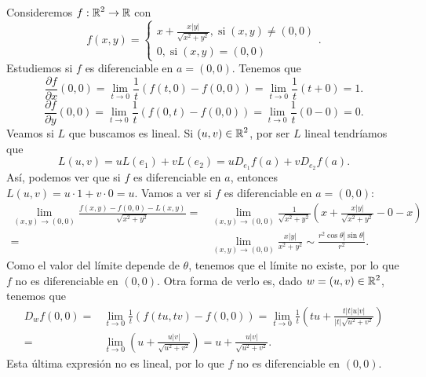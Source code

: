 \begin{eg}
Consideremos $\displaystyle f : \mathbb{R}^{2} \to \mathbb{R} $ con 
\[f\left(x,y\right) = 
\begin{cases}
x + \frac{x \left|y\right|}{\sqrt{x^{2}+y^{2}}}, \; \text{si} \; \left(x,y\right) \neq \left(0,0\right) \\
0, \; \text{si} \; \left(x,y\right) = \left(0,0\right)
\end{cases}
.\]
Estudiemos si $\displaystyle f $ es diferenciable en $\displaystyle a = \left(0,0\right) $. Tenemos que
\[\frac{\partial f}{\partial x}\left(0,0\right) = \lim_{t \to 0}\frac{1}{t}\left(f\left(t,0\right)-f\left(0,0\right)\right) = \lim_{t \to 0}\frac{1}{t}\left(t+0\right) = 1 .\]
\[\frac{\partial f}{\partial y}\left(0,0\right) = \lim_{t \to 0}\frac{1}{t}\left(f\left(0,t\right)-f\left(0,0\right)\right) = \lim_{t \to 0}\frac{1}{t}\left(0 - 0\right) = 0 .\]
Veamos si $\displaystyle L $ que buscamos es lineal. Si $\displaystyle \left(u,v\right) \in \mathbb{R}^{2} $, por ser $\displaystyle L $ lineal tendríamos que
\[L\left(u,v\right) = uL\left(e_{1}\right) + vL\left(e_{2}\right) = u D_{e_{1}}f\left(a\right)+vD_{e_{2}}f\left(a\right)  .\]
Así, podemos ver que si $\displaystyle f $ es diferenciable en $\displaystyle a $, entonces $\displaystyle L\left(u,v\right) = u \cdot 1 + v \cdot 0 = u$. Vamos a ver si $\displaystyle f $ es diferenciable en $\displaystyle a = \left(0,0\right) $:
\[
\begin{split}
	\lim_{\left(x,y\right) \to \left(0,0\right)}\frac{f\left(x,y\right)-f\left(0,0\right)-L\left(x,y\right)}{\sqrt{x^{2}+y^{2}}} = & \lim_{\left(x,y\right) \to \left(0,0\right)}\frac{1}{\sqrt{x^{2}+y^{2}}} \left(x + \frac{x \left|y\right|}{\sqrt{x^{2}+y^{2}}}-0-x\right) \\
	= & \lim_{\left(x,y\right) \to \left(0,0\right)}\frac{x \left|y\right|}{x^{2}+y^{2}} \sim \frac{r^{2}\cos\theta \left|\sin\theta \right|}{r^{2}}.
\end{split}
\]
Como el valor del límite depende de $\displaystyle \theta $, tenemos que el límite no existe, por lo que $\displaystyle f $ no es diferenciable en $\displaystyle \left(0,0\right) $. Otra forma de verlo es, dado $\displaystyle w = \left(u,v\right) \in \mathbb{R}^{2} $, tenemos que 
\[
\begin{split}
	D_{w}f\left(0,0\right) = & \lim_{t \to 0}\frac{1}{t}\left(f\left(tu,tv\right)-f\left(0,0\right)\right) = \lim_{t \to 0}\frac{1}{t}\left(tu + \frac{t \left|t\right|u \left|v\right|}{ \left|t\right|\sqrt{u^{2}+v^{2}}}\right) \\
	= & \lim_{t \to 0}\left(u +\frac{u \left|v\right|}{ \sqrt{u^{2}+v^{2}}}\right) = u + \frac{u \left|v\right|}{\sqrt{u^{2}+v^{2}}} .
\end{split}
\]
Esta última expresión no es lineal, por lo que $\displaystyle f $ no es diferenciable en $\displaystyle \left(0,0\right)$.
\end{eg}
